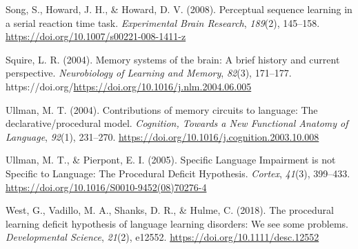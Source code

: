 \documentclass[
  10pt,
  letterpaper]{article}
\newlength{\cslhangindent}
\newenvironment{CSLReferences}[2] %
 {\begin{list}{}{%
  \setlength{\itemindent}{0pt}
  \setlength{\leftmargin}{0pt}
  \setlength{\parsep}{0pt}
  \ifodd #1
   \setlength{\leftmargin}{\cslhangindent}
   \setlength{\itemindent}{-1\cslhangindent}
  \fi
  \setlength{\itemsep}{#2\baselineskip}}}
 {\end{list}}
\begin{document}
\begin{CSLReferences}{1}{0}
Song, S., Howard, J. H., \& Howard, D. V. (2008). Perceptual sequence
learning in a serial reaction time task. \emph{Experimental Brain
Research}, \emph{189}(2), 145--158.
\url{https://doi.org/10.1007/s00221-008-1411-z}

Squire, L. R. (2004). Memory systems of the brain: {A} brief history and
current perspective. \emph{Neurobiology of Learning and Memory},
\emph{82}(3), 171--177.
https://doi.org/\url{https://doi.org/10.1016/j.nlm.2004.06.005}

Ullman, M. T. (2004). Contributions of memory circuits to language: The
declarative/procedural model. \emph{Cognition, Towards a {New}
{Functional} {Anatomy} of {Language}}, \emph{92}(1), 231--270.
\url{https://doi.org/10.1016/j.cognition.2003.10.008}

Ullman, M. T., \& Pierpont, E. I. (2005). Specific {Language}
{Impairment} is not {Specific} to {Language}: The {Procedural} {Deficit}
{Hypothesis}. \emph{Cortex}, \emph{41}(3), 399--433.
\url{https://doi.org/10.1016/S0010-9452(08)70276-4}

West, G., Vadillo, M. A., Shanks, D. R., \& Hulme, C. (2018). The
procedural learning deficit hypothesis of language learning disorders:
We see some problems. \emph{Developmental Science}, \emph{21}(2),
e12552. \url{https://doi.org/10.1111/desc.12552}

\end{CSLReferences}
\end{document}
